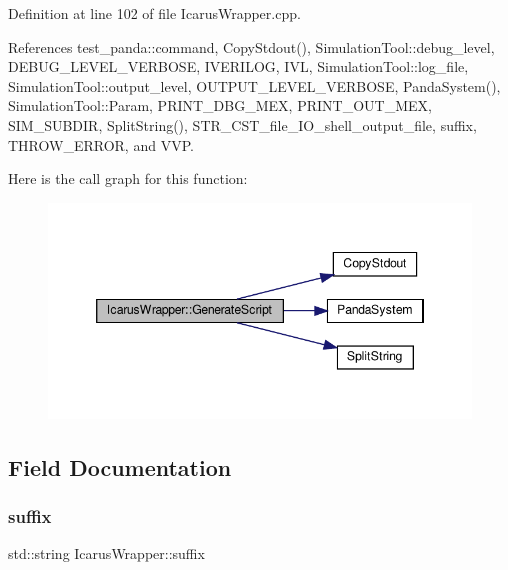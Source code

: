 Definition at line 102 of file Icarus\+Wrapper.\+cpp.



References test\+\_\+panda\+::command, Copy\+Stdout(), Simulation\+Tool\+::debug\+\_\+level, D\+E\+B\+U\+G\+\_\+\+L\+E\+V\+E\+L\+\_\+\+V\+E\+R\+B\+O\+SE, I\+V\+E\+R\+I\+L\+OG, I\+VL, Simulation\+Tool\+::log\+\_\+file, Simulation\+Tool\+::output\+\_\+level, O\+U\+T\+P\+U\+T\+\_\+\+L\+E\+V\+E\+L\+\_\+\+V\+E\+R\+B\+O\+SE, Panda\+System(), Simulation\+Tool\+::\+Param, P\+R\+I\+N\+T\+\_\+\+D\+B\+G\+\_\+\+M\+EX, P\+R\+I\+N\+T\+\_\+\+O\+U\+T\+\_\+\+M\+EX, S\+I\+M\+\_\+\+S\+U\+B\+D\+IR, Split\+String(), S\+T\+R\+\_\+\+C\+S\+T\+\_\+file\+\_\+\+I\+O\+\_\+shell\+\_\+output\+\_\+file, suffix, T\+H\+R\+O\+W\+\_\+\+E\+R\+R\+OR, and V\+VP.

Here is the call graph for this function\+:
\nopagebreak
\begin{figure}[H]
\begin{center}
\leavevmode
\includegraphics[width=346pt]{dd/dd1/classIcarusWrapper_adf6d3591e5e20f081e89122563c04176_cgraph}
\end{center}
\end{figure}


\subsection{Field Documentation}
\mbox{\label{classIcarusWrapper_afbcc8662a0202ac922e161e6db2eecb7}} 
\subsubsection{\texorpdfstring{suffix}{suffix}}
{\footnotesize\ttfamily std\+::string Icarus\+Wrapper\+::suffix\hspace{0.3cm}{\ttfamily [private]}}



